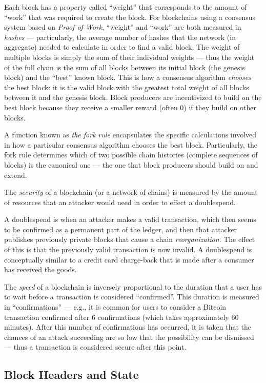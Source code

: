 \documentclass[a4paper,]{article}
\begin{document}
Each block has a property called ``weight'' that corresponds to the amount of ``work'' that was required to create the block.
For blockchains using a consensus system based on \emph{Proof of Work}, ``weight'' and ``work'' are both measured in \emph{hashes} --- particularly, the average number of hashes that the network (in aggregate) needed to calculate in order to find a valid block.
The weight of multiple blocks is simply the sum of their individual weights --- thus the weight of the full chain is the sum of all blocks between its initial block (the genesis block) and the ``best'' known block.
This is how a consensus algorithm \emph{chooses} the best block: it is the valid block with the greatest total weight of all blocks between it and the genesis block.
Block producers are incentivized to build on the best block because they receive a smaller reward (often 0) if they build on other blocks.

A function known as \emph{the fork rule} encapsulates the specific calculations involved in how a particular consensus algorithm chooses the best block.
Particularly, the fork rule determines which of two possible chain histories (complete sequences of blocks) is the canonical one --- the one that block producers should build on and extend.

The \emph{security} of a blockchain (or a network of chains) is measured by the amount of resources that an attacker would need in order to effect a doublespend.

A doublespend is when an attacker makes a valid transaction, which then seems to be confirmed as a permanent part of the ledger, and then that attacker publishes previously private blocks that cause a chain \emph{reorganization}.
The effect of this is that the previously valid transaction is now invalid.
A doublespend is conceptually similar to a credit card charge-back that is made after a consumer has received the goods.

The \emph{speed} of a blockchain is inversely proportional to the duration that a user has to wait before a transaction is considered ``confirmed''.
This duration is measured in ``confirmations'' --- e.g., it is common for users to consider a Bitcoin transaction confirmed after 6 confirmations (which takes approximately 60 minutes).
After this number of confirmations has occurred, it is taken that the chances of an attack succeeding are so low that the possibility can be dismissed --- thus a transaction is considered secure after this point.

\subsection{Block Headers and State}
\end{document}
